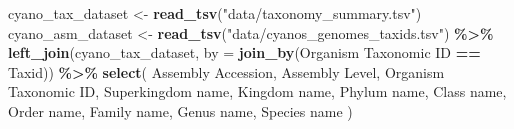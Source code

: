 \documentclass[
]{article}
\newenvironment{Shaded}{\begin{snugshade}}{\end{snugshade}}
\newcommand{\AttributeTok}[1]{\textcolor[rgb]{0.13,0.29,0.53}{#1}}
\newcommand{\FunctionTok}[1]{\textcolor[rgb]{0.13,0.29,0.53}{\textbf{#1}}}
\newcommand{\NormalTok}[1]{#1}
\newcommand{\OtherTok}[1]{\textcolor[rgb]{0.56,0.35,0.01}{#1}}
\newcommand{\SpecialCharTok}[1]{\textcolor[rgb]{0.81,0.36,0.00}{\textbf{#1}}}
\newcommand{\StringTok}[1]{\textcolor[rgb]{0.31,0.60,0.02}{#1}}
\begin{document}
\begin{Shaded}
\begin{Highlighting}[]
\NormalTok{cyano\_tax\_dataset }\OtherTok{\textless{}{-}} \FunctionTok{read\_tsv}\NormalTok{(}\StringTok{"data/taxonomy\_summary.tsv"}\NormalTok{)}
\NormalTok{cyano\_asm\_dataset }\OtherTok{\textless{}{-}} \FunctionTok{read\_tsv}\NormalTok{(}\StringTok{"data/cyanos\_genomes\_taxids.tsv"}\NormalTok{) }\SpecialCharTok{\%\textgreater{}\%} 
    \FunctionTok{left\_join}\NormalTok{(cyano\_tax\_dataset, }\AttributeTok{by =} \FunctionTok{join\_by}\NormalTok{(}\StringTok{\textquotesingle{}Organism Taxonomic ID\textquotesingle{}} \SpecialCharTok{==} \StringTok{\textquotesingle{}Taxid\textquotesingle{}}\NormalTok{)) }\SpecialCharTok{\%\textgreater{}\%} 
    \FunctionTok{select}\NormalTok{(}
        \StringTok{\textasciigrave{}}\AttributeTok{Assembly Accession}\StringTok{\textasciigrave{}}\NormalTok{, }
        \StringTok{\textasciigrave{}}\AttributeTok{Assembly Level}\StringTok{\textasciigrave{}}\NormalTok{, }
        \StringTok{\textasciigrave{}}\AttributeTok{Organism Taxonomic ID}\StringTok{\textasciigrave{}}\NormalTok{, }
        \StringTok{\textasciigrave{}}\AttributeTok{Superkingdom name}\StringTok{\textasciigrave{}}\NormalTok{, }
        \StringTok{\textasciigrave{}}\AttributeTok{Kingdom name}\StringTok{\textasciigrave{}}\NormalTok{, }
        \StringTok{\textasciigrave{}}\AttributeTok{Phylum name}\StringTok{\textasciigrave{}}\NormalTok{, }
        \StringTok{\textasciigrave{}}\AttributeTok{Class name}\StringTok{\textasciigrave{}}\NormalTok{, }
        \StringTok{\textasciigrave{}}\AttributeTok{Order name}\StringTok{\textasciigrave{}}\NormalTok{, }
        \StringTok{\textasciigrave{}}\AttributeTok{Family name}\StringTok{\textasciigrave{}}\NormalTok{, }
        \StringTok{\textasciigrave{}}\AttributeTok{Genus name}\StringTok{\textasciigrave{}}\NormalTok{, }
        \StringTok{\textasciigrave{}}\AttributeTok{Species name}\StringTok{\textasciigrave{}}
\NormalTok{    )}


\end{Highlighting}
\end{Shaded}
\end{document}
